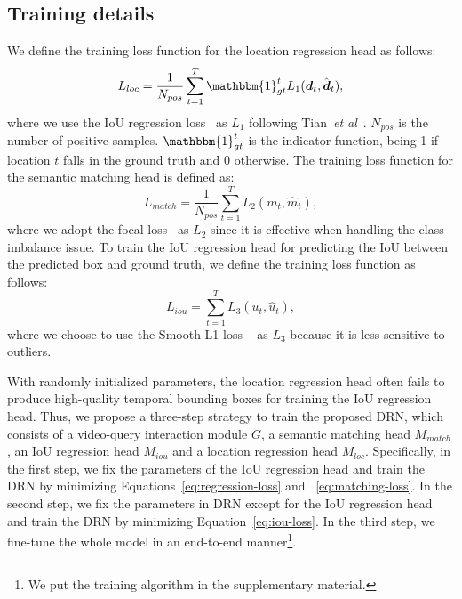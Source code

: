 \documentclass[10pt,twocolumn,letterpaper]{article}
\def\etal{\emph{et al}\onedot}
\def\Vec#1{{\boldsymbol{#1}}}
\begin{document}
	

	


	

	
	


	
	\subsection{Training details}
	\label{sec:training}
	
	We define the training loss function for the location regression head as follows:
	\begin{equation}\label{eq:regression-loss}
	L_{loc}  =  \frac{1}{N_{pos}} \sum_{t=1}^{T} \mathbbm{1}_{gt}^t L_{1}(\Vec{d}_t, \hat{\Vec{d}}_t),
	\end{equation}
	where we use the IoU regression loss~\cite{yu2016unitbox} as  $L_{1}$ following Tian~\etal~\cite{tian2019fcos}. $N_{pos}$ is the number of positive samples. $\mathbbm{1}_{gt}^t$ is the indicator function, being 1 if location $t$ falls in the ground truth and 0 otherwise.
	The training loss function for the semantic matching head is defined as:
	\begin{equation}\label{eq:matching-loss}
	L_{match} = \frac{1}{N_{pos}} \sum_{t=1}^{T} L_{2}(m_t, \hat{m}_t),
	\end{equation}
	where we adopt the focal loss~\cite{lin2017focal} as $L_{2}$ since it is effective when handling the class imbalance issue. 
	To train the IoU regression head for predicting the IoU between the predicted box and ground truth, we define the training loss function as follows:
	\begin{equation}\label{eq:iou-loss}
	L_{iou} = \sum_{t=1}^T L_{3}(u_t, \hat{u}_t),
	\end{equation}
	where we choose to use the Smooth-L1 loss ~\cite{girshick2015fast} as $L_{3}$ because it is less sensitive to outliers.
	


With randomly initialized parameters, the location regression head often fails to produce high-quality temporal bounding boxes for training the IoU regression head. Thus, we propose a three-step strategy to train the proposed DRN, which consists of a video-query interaction module $G$, a semantic matching head $M_{match}$, an IoU regression head $M_{iou}$ and a location regression head $M_{loc}$.
	Specifically, in the first step, we fix the parameters of the IoU regression head and train the DRN by minimizing Equations~\eqref{eq:regression-loss} and ~\eqref{eq:matching-loss}. In the second step, we fix the parameters in DRN except for the IoU regression head and train the DRN by minimizing Equation~\eqref{eq:iou-loss}. 
In the third step, we fine-tune the whole model in an end-to-end manner\footnote{We put the training algorithm in the supplementary material.}.
\end{document}
